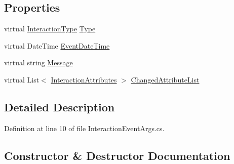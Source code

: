 \subsection*{Properties}
\begin{DoxyCompactItemize}
\item 
virtual \hyperlink{namespace_plex_byte_1_1_mo_cap_1_1_interactions_a6e7bea333446664bbce2bb296db25e31}{Interaction\+Type} \hyperlink{class_plex_byte_1_1_mo_cap_1_1_interactions_1_1_interaction_event_args_a0783f16c0e4140f16a9448f63ff28f5b}{Type}
\item 
virtual Date\+Time \hyperlink{class_plex_byte_1_1_mo_cap_1_1_interactions_1_1_interaction_event_args_a371473e88cd5dcfc31b103bedac6470e}{Event\+Date\+Time}
\item 
virtual string \hyperlink{class_plex_byte_1_1_mo_cap_1_1_interactions_1_1_interaction_event_args_a92bca66520070fac40f3b94a42ae0966}{Message}
\item 
virtual List$<$ \hyperlink{namespace_plex_byte_1_1_mo_cap_1_1_interactions_aa78ff2ea1c7ea92537cb6b3552b6a7da}{Interaction\+Attributes} $>$ \hyperlink{class_plex_byte_1_1_mo_cap_1_1_interactions_1_1_interaction_event_args_a3ecc8573a86ce5c0f2600ddff24d992e}{Changed\+Attribute\+List}
\end{DoxyCompactItemize}


\subsection{Detailed Description}


Definition at line 10 of file Interaction\+Event\+Args.\+cs.



\subsection{Constructor \& Destructor Documentation}
